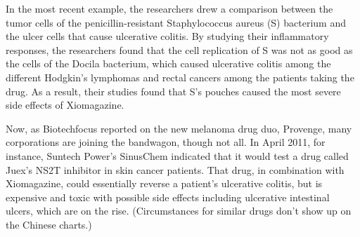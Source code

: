 \documentclass{article}
\begin{document}
In the most recent example, the researchers drew a comparison between the tumor cells of the penicillin-resistant Staphylococcus aureus (S) bacterium and the ulcer cells that cause ulcerative colitis. By studying their inflammatory responses, the researchers found that the cell replication of S was not as good as the cells of the Docila bacterium, which caused ulcerative colitis among the different Hodgkin’s lymphomas and rectal cancers among the patients taking the drug. As a result, their studies found that S’s pouches caused the most severe side effects of Xiomagazine.

Now, as Biotechfocus reported on the new melanoma drug duo, Provenge, many corporations are joining the bandwagon, though not all. In April 2011, for instance, Suntech Power’s SinusChem indicated that it would test a drug called Juex’s NS2T inhibitor in skin cancer patients. That drug, in combination with Xiomagazine, could essentially reverse a patient’s ulcerative colitis, but is expensive and toxic with possible side effects including ulcerative intestinal ulcers, which are on the rise. (Circumstances for similar drugs don’t show up on the Chinese charts.)
\end{document}
